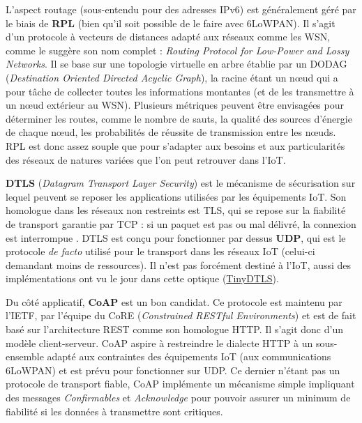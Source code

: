 \documentclass[]{article}
\begin{document}
\par L'aspect routage (sous-entendu pour des adresses IPv6) est généralement géré par le biais de \textbf{RPL} (bien qu'il soit possible de le faire avec 6LoWPAN). Il s'agit d'un protocole à vecteurs de distances adapté aux réseaux comme les WSN, comme le suggère son nom complet : \textit{Routing Protocol for Low-Power and Lossy Networks}. Il se base sur une topologie virtuelle en arbre établie par un DODAG (\textit{Destination Oriented Directed Acyclic Graph}), la racine étant un nœud qui a pour tâche de collecter toutes les informations montantes (et de les transmettre à un nœud extérieur au WSN). Plusieurs métriques peuvent être envisagées pour déterminer les routes, comme le nombre de sauts, la qualité des sources d'énergie de chaque nœud, les probabilités de réussite de transmission entre les nœuds. RPL est donc assez souple que pour s'adapter aux besoins et aux particularités des réseaux de natures variées que l'on peut retrouver dans l'IoT.\\

\par \textbf{DTLS} (\textit{Datagram Transport Layer Security}) est le mécanisme de sécurisation sur lequel peuvent se reposer les applications utilisées par les équipements IoT. Son homologue dans les réseaux non restreints est TLS, qui se repose sur la fiabilité de transport garantie par TCP : si un paquet est pas ou mal délivré, la connexion est interrompue \cite{Lakkundi2014}. DTLS est conçu pour fonctionner par dessus \textbf{UDP}, qui est le protocole \textit{de facto} utilisé pour le transport dans les réseaux IoT (celui-ci demandant moins de ressources). Il n'est pas forcément destiné à l'IoT, aussi des implémentations ont vu le jour dans cette optique (\href{https://projects.eclipse.org/proposals/tinydtls}{TinyDTLS}).\\

\par Du côté applicatif, \textbf{CoAP} est un bon candidat. Ce protocole est maintenu par l'IETF, par l'équipe du CoRE (\textit{Constrained RESTful Environments}) et est de fait basé sur l'architecture REST \cite{Granjal2015} comme son homologue HTTP. Il s'agit donc d'un modèle client-serveur. CoAP aspire à restreindre le dialecte HTTP à un sous-ensemble adapté aux contraintes des équipements IoT (aux communications 6LoWPAN) et est prévu pour fonctionner sur UDP. Ce dernier n'étant pas un protocole de transport fiable, CoAP implémente un mécanisme simple impliquant des messages \textit{Confirmables} et \textit{Acknowledge} pour pouvoir assurer un minimum de fiabilité si les données à transmettre sont critiques.\\
\end{document}
